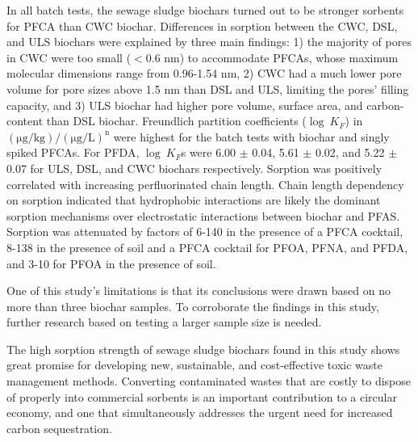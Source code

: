 In all batch tests, the sewage sludge biochars turned out to be stronger sorbents for PFCA than CWC biochar. Differences in sorption between the CWC, DSL, and ULS biochars were explained by three main findings: 1) the majority of pores in CWC were too small ($<$0.6 nm) to accommodate PFCAs, whose maximum molecular dimensions range from 0.96-1.54 nm, 2) CWC had a much lower pore volume for pore sizes above 1.5 nm than DSL and ULS, limiting the pores' filling capacity, and 3) ULS biochar had higher pore volume, surface area, and carbon-content than DSL biochar. Freundlich partition coefficients ($\log~K_F$) in $\mathrm{(\mu g/kg)/(\mu g/L)^n}$ were highest for the batch tests with biochar and singly spiked PFCAs. For PFDA, $\log~K_F$s were 6.00 $\pm$ 0.04, 5.61 $\pm$ 0.02, and 5.22 $\pm$ 0.07 for ULS, DSL, and CWC biochars respectively. Sorption was positively correlated with increasing perfluorinated chain length. Chain length dependency on sorption indicated that hydrophobic interactions are likely the dominant sorption mechanisms over electrostatic interactions between biochar and PFAS. Sorption was attenuated by factors of 6-140 in the presence of a PFCA cocktail, 8-138 in the presence of soil and a PFCA cocktail for PFOA, PFNA, and PFDA, and 3-10 for PFOA in the presence of soil.

One of this study's limitations is that its conclusions were drawn based on no more than three biochar samples. To corroborate the findings in this study, further research based on testing a larger sample size is needed.

The high sorption strength of sewage sludge biochars found in this study shows great promise for developing new, sustainable, and cost-effective toxic waste management methods. Converting contaminated wastes that are costly to dispose of properly into commercial sorbents is an important contribution to a circular economy, and one that simultaneously addresses the urgent need for increased carbon sequestration.






